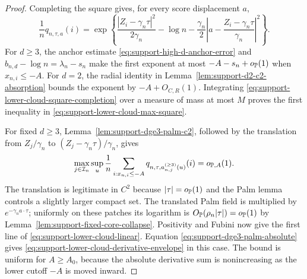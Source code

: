 \begin{proof}
Completing the square gives, for every score displacement \(a\),
\begin{equation}
\label{eq:support-lower-cloud-square-completion}
 \frac1nq_{n,\tau,a}(i)
 =\exp\left\{
   \frac{|Z_i-\gamma_n\tau|^2}{2\gamma_n}-\log n
   -\frac{\gamma_n}{2}
      \left|a-\frac{Z_i-\gamma_n\tau}{\gamma_n}\right|^2
 \right\}.
\end{equation}
For \(d\ge3\), the anchor estimate
\eqref{eq:support-high-d-anchor-error} and
\(b_{n,d}-\log n=\lambda_n-s_n\) make the first exponent at most
\(-A-s_n+o_{\mathbb P}(1)\) when \(x_{n,i}\le-A\).  For \(d=2\), the radial
identity in Lemma~\ref{lem:support-d2-c2-absorption} bounds the exponent by
\(-A+O_{C,R}(1)\). Integrating
\eqref{eq:support-lower-cloud-square-completion} over a measure of mass at most
\(M\) proves the first inequality in
\eqref{eq:support-lower-cloud-max-square}.

For fixed \(d\ge3\), Lemma~\ref{lem:support-dge3-palm-c2}, followed by the
translation from \(Z_j/\gamma_n\) to
\((Z_j-\gamma_n\tau)/\gamma_n\), gives
\[
 \max_{j\in\mathcal I_n}\sup_{u}
 \frac1n\sum_{i:x_{n,i}\le-A}
 q_{n,\tau,a_{n,j}^{(\ge3)}(u)}(i)=o_{\mathbb P,A}(1).
\]
The translation is legitimate in \(C^2\) because
\(|\tau|=o_{\mathbb P}(1)\) and the Palm lemma controls a slightly larger compact
set.  The translated Palm field is multiplied by
\(e^{-\gamma_na\cdot\tau}\); uniformly on these patches its logarithm is
\(O_{\mathbb P}(\rho_n|\tau|)=o_{\mathbb P}(1)\) by
Lemma~\ref{lem:support-fixed-core-collapse}.  Positivity and Fubini now give the first line of
\eqref{eq:support-lower-cloud-linear}.
Equation \eqref{eq:support-dge3-palm-absolute} gives
\eqref{eq:support-lower-cloud-derivative-envelope} in this case.  The bound is
uniform for \(A\ge A_0\), because the absolute derivative sum is nonincreasing
as the lower cutoff \(-A\) is moved inward.


\end{proof}
